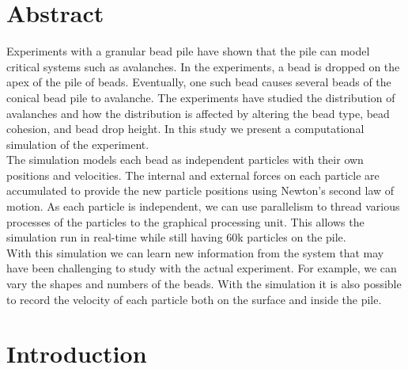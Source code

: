 \documentclass{book}
\begin{document}
\chapter*{Abstract}
\indent Experiments with a granular bead pile have shown that the pile can model critical systems such as avalanches. In the experiments, a bead is dropped on the apex of the pile of beads. Eventually, one such bead causes several beads of the conical bead pile to avalanche. The experiments have studied the distribution of avalanches and how the distribution is affected by altering the bead type, bead cohesion, and bead drop height. In this study we present a computational simulation of the experiment.\\
 \indent The simulation models each bead as independent particles with their own positions and velocities. The internal and external forces on each particle are accumulated to provide the new particle positions using Newton's second law of motion. As each particle is independent, we can use parallelism to thread various processes of the particles to the graphical processing unit. This allows the simulation run in real-time while still having $60$k particles on the pile.\\
\indent With this simulation we can learn new information from the system that may have been challenging to study with the actual experiment. For example, we can vary the shapes and numbers of the beads. With the simulation it is also possible to record the velocity of each particle both on the surface and inside the pile. 


\tableofcontents
\setcounter{tocdepth}{2}
\listoftables
\listoffigures

\mainmatter

\chapter{Introduction}\label{introduction}
\end{document}
